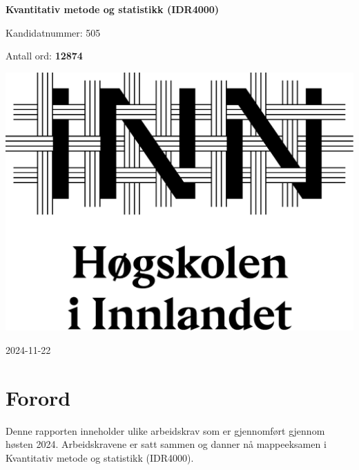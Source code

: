 \documentclass[
  letterpaper,
  DIV=11,
  numbers=noendperiod]{scrreprt}
\author{}
\date{}
\renewcommand*\contentsname{Table of contents}
\newcommand\contentsname{Table of contents}
\begin{document}
\begin{titlepage}
\begin{center}
\vspace*{1cm}

{\Huge \textbf{Kvantitativ metode og statistikk (IDR4000)}}

\vspace{1cm}
{\Large Kandidatnummer: 505}

\vspace{1cm}
Antall ord: \textbf{12874} %

\vspace{5cm}
\includegraphics[width=1.6\textwidth]{logo.png}

\vfill
{\large 2024-11-22}

\end{center}
\end{titlepage}

\renewcommand*\contentsname{Table of contents}
{
\hypersetup{linkcolor=}
\setcounter{tocdepth}{2}
\tableofcontents
}


\chapter*{Forord}\label{forord}


Denne rapporten inneholder ulike arbeidskrav som er gjennomført gjennom
høsten 2024. Arbeidskravene er satt sammen og danner nå mappeeksamen i
Kvantitativ metode og statistikk (IDR4000).
\end{document}
